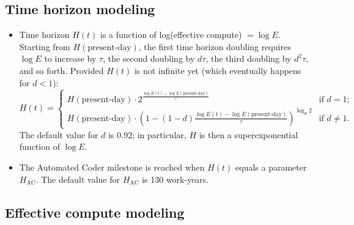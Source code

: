 \documentclass{article}
\theoremstyle{definition}
\begin{document}
\subsection{Time horizon modeling}

\begin{itemize}
\item Time horizon $H(t)$ is a function of log(effective compute) $=\log E$. Starting from $H(\text{present-day})$, the first time horizon doubling requires $\log E$ to increase by $\tau$, the second doubling by $d \tau$, the third doubling by $d^2 \tau$, and so forth. Provided $H(t)$ is not infinite yet (which eventually happens for $d < 1$):
\[ H(t) = 
\begin{cases} 
H(\text{present-day}) \cdot 2^{\frac{\log E(t)-\log E(\text{present-day})}{\tau}} & \text{if $d = 1$}; \\
H(\text{present-day}) \cdot \left(1 - (1-d) \frac{\log E(t)-\log E(\text{present-day})}{\tau}\right)^{\log_d 2} & \text{if $d \neq 1$.}
\end{cases}
\]
The default value for $d$ is $0.92$; in particular, $H$ is then a superexponential function of $\log E$.
\item The Automated Coder milestone is reached when $H(t)$ equals a parameter $H_{\text{AC}}$. The default value for $H_{\text{AC}}$ is 130 work-years.
\end{itemize}

\subsection{Effective compute modeling}
\end{document}
